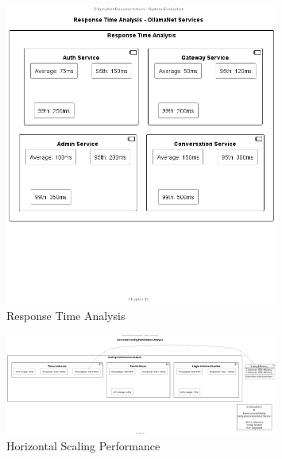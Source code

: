 \begin{figure}[h]
\centering
\includegraphics[width=0.8\textwidth]{Chapter09/figures/response_time_analysis.png}
\caption{Response Time Analysis}
\label{fig:response_time_analysis}
\end{figure}


\begin{figure}[h]
\centering
\includegraphics[width=0.8\textwidth]{Chapter09/figures/horizontal_scaling_performance.png}
\caption{Horizontal Scaling Performance}
\label{fig:horizontal_scaling}
\end{figure}

